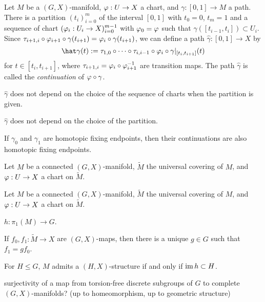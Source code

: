 \documentclass[a4paper]{article}
\begin{document}
\begin{prb}
Let $M$ be a $(G,X)$-manifold, $\varphi:U\to X$ a chart, and $\gamma:[0,1]\to M$ a path.
There is a partition $(t_i)_{i=0}^m$ of the interval $[0,1]$ with $t_0=0$, $t_m=1$ and a sequence of chart $(\varphi_i:U_i\to X)_{i=0}^{m-1}$ with $\varphi_0=\varphi$ such that $\gamma([t_{i-1},t_i])\subset U_i$.
Since $\tau_{i+1,i}\circ\varphi_{i+1}\circ\gamma(t_{i+1})=\varphi_i\circ\gamma(t_{i+1})$, we can define a path $\hat\gamma:[0,1]\to X$ by
\[\hat\gamma(t):=\tau_{1,0}\circ\cdots\circ\tau_{i,i-1}\circ\f_i\circ\gamma|_{[t_i,t_{i+1}]}(t)\]
for $t\in[t_i,t_{i+1}]$, where $\tau_{i+1,i}=\varphi_i\circ\varphi_{i+1}^{-1}$ are transition maps.
The path $\hat\gamma$ is called the \emph{continuation} of $\varphi\circ\gamma$.
\begin{parts}
\item $\hat\gamma$ does not depend on the choice of the sequence of charts when the partition is given.
\item $\hat\gamma$ does not depend on the choice of the partition.
\item If $\gamma_0$ and $\gamma_1$ are homotopic fixing endpoints, then their continuations are also homotopic fixing endpoints.
\end{parts}
\end{prb}

\begin{prb}
Let $M$ be a connected $(G,X)$-manifold, $\tilde M$ the universal covering of $M$, and $\varphi:U\to X$ a chart on $\tilde M$.
\end{prb}

\begin{prb}[Holonomy]
Let $M$ be a connected $(G,X)$-manifold, $\tilde M$ the universal covering of $M$, and $\varphi:U\to X$ a chart on $\tilde M$.

$h:\pi_1(M)\to G$.
\begin{parts}
\item If $f_0,f_1:\tilde M\to X$ are $(G,X)$-maps, then there is a unique $g\in G$ such that $f_1=gf_0$.
\item For $H\le G$, $M$ admits a $(H,X)$-structure if and only if $\operatorname{im} h\subset H$.
\end{parts}
\end{prb}





surjectivity of a map from torsion-free discrete subgroups of $G$ to complete $(G,X)$-manifolds?
(up to homeomorphism, up to geometric structure)
\end{document}

